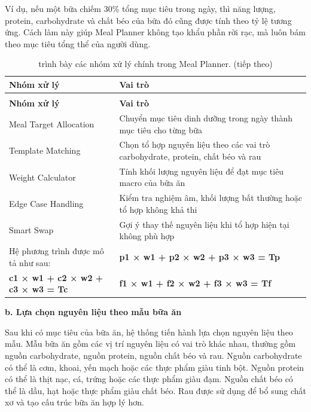 \documentclass[12pt, a4paper]{report}
\begin{document}
Ví dụ, nếu một bữa chiếm 30\% tổng mục tiêu trong ngày, thì năng lượng, protein, carbohydrate và chất béo của bữa đó cũng được tính theo tỷ lệ tương ứng. Cách làm này giúp Meal Planner không tạo khẩu phần rời rạc, mà luôn bám theo mục tiêu tổng thể của người dùng.

\begin{longtable}{|p{5cm}|p{10cm}|}
\caption{trình bày các nhóm xử lý chính trong Meal Planner.} \\
\hline
\textbf{Nhóm xử lý} & \textbf{Vai trò} \\
\hline
\endfirsthead
\caption[]{trình bày các nhóm xử lý chính trong Meal Planner. (tiếp theo)} \\
\hline
\textbf{Nhóm xử lý} & \textbf{Vai trò} \\
\hline
\endhead
\hline
\endfoot
\hline
\endlastfoot
Meal Target Allocation & Chuyển mục tiêu dinh dưỡng trong ngày thành mục tiêu cho từng bữa \\
\hline
Template Matching & Chọn tổ hợp nguyên liệu theo các vai trò carbohydrate, protein, chất béo và rau \\
\hline
Weight Calculator & Tính khối lượng nguyên liệu để đạt mục tiêu macro của bữa ăn \\
\hline
Edge Case Handling & Kiểm tra nghiệm âm, khối lượng bất thường hoặc tổ hợp không khả thi \\
\hline
Smart Swap & Gợi ý thay thế nguyên liệu khi tổ hợp hiện tại không phù hợp \\
\hline
\hline
\hline
\hline
\hline
Hệ phương trình được mô tả như sau: & \textbf{p1 × w1 + p2 × w2 + p3 × w3 = Tp} \\
\hline
\textbf{c1 × w1 + c2 × w2 + c3 × w3 = Tc} & \textbf{f1 × w1 + f2 × w2 + f3 × w3 = Tf} \\
\hline
\hline
\hline
\hline
\hline
\hline
\hline
\end{longtable}

\textbf{b. Lựa chọn nguyên liệu theo mẫu bữa ăn}

Sau khi có mục tiêu của bữa ăn, hệ thống tiến hành lựa chọn nguyên liệu theo mẫu. Mẫu bữa ăn gồm các vị trí nguyên liệu có vai trò khác nhau, thường gồm nguồn carbohydrate, nguồn protein, nguồn chất béo và rau. Nguồn carbohydrate có thể là cơm, khoai, yến mạch hoặc các thực phẩm giàu tinh bột. Nguồn protein có thể là thịt nạc, cá, trứng hoặc các thực phẩm giàu đạm. Nguồn chất béo có thể là dầu, hạt hoặc thực phẩm giàu chất béo. Rau được sử dụng để bổ sung chất xơ và tạo cấu trúc bữa ăn hợp lý hơn.
\end{document}

